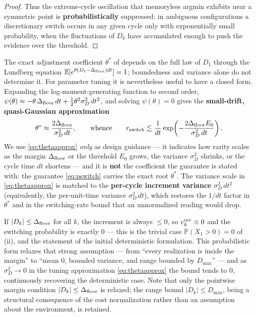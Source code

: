 \begin{proof}
Thus the extreme-cycle oscillation that memoryless argmin exhibits near a symmetric point is \textbf{probabilistically} suppressed: in ambiguous configurations a discretionary switch occurs in any given cycle only with exponentially small probability, when the fluctuations of $D_k$ have accumulated enough to push the evidence over the threshold.
\end{proof}

\begin{remark} \label{rem:tuning}
The exact adjustment coefficient $\theta^*$ of  depends on the full law of $D_1$ through the Lundberg equation $\mathbb{E}[e^{\theta (D_1-\Delta_{\text{floor}})dt}] = 1$; boundedness and variance alone do not determine it. For parameter tuning it is nevertheless useful to have a closed form. Expanding the log-moment-generating function to second order, $\psi(\theta) \approx -\theta\,\Delta_{\text{floor}}\,dt + \tfrac{1}{2}\theta^2 \sigma_D^2\, dt^2$, and solving $\psi(\theta) = 0$ gives the \textbf{small-drift, quasi-Gaussian approximation}
\begin{equation}
\theta^* \approx \frac{2\Delta_{\text{floor}}}{\sigma_D^2\, dt},
\qquad\text{whence}\qquad
r_{\text{switch}} \lesssim \frac{1}{dt} \exp\!\left(-\frac{2\Delta_{\text{floor}} E_0}{\sigma_D^2\, dt}\right).
\label{eq:thetaapprox}
\end{equation}
We use \eqref{eq:thetaapprox} \emph{only} as design guidance --- it indicates how rarity scales as the margin $\Delta_{\text{floor}}$ or the threshold $E_0$ grows, the variance $\sigma_D^2$ shrinks, or the cycle time $dt$ shortens --- and it is \textbf{not} the coefficient the guarantee is stated with: the guarantee \eqref{eq:pswitch} carries the exact root $\theta^*$. The variance scale in \eqref{eq:thetaapprox} is matched to the \textbf{per-cycle increment variance $\sigma_D^2\,dt^2$} (equivalently, the per-unit-time variance $\sigma_D^2\,dt$), which restores the $1/dt$ factor in $\theta^*$ and in the switching-rate bound that an unnormalized reading would drop.
\end{remark}

\begin{remark}
If $|D_k| \le \Delta_{\text{floor}}$ for all $k$, the increment is always $\le 0$, so $e^{\text{rev}}_k \equiv 0$ and the switching probability is exactly 0 --- this is the trivial case $\mathbb{P}(X_1 > 0) = 0$ of (ii), and the statement of the initial deterministic formulation. This probabilistic form relaxes that strong assumption --- from ``every realization is inside the margin'' to ``mean 0, bounded variance, and range bounded by $D_{\max}$'' --- and as $\sigma_D^2 \to 0$ in the tuning approximation \eqref{eq:thetaapprox} the bound tends to 0, continuously recovering the deterministic case. Note that only the pointwise margin condition $|D_k| \le \Delta_{\text{floor}}$ is relaxed; the range bound $|D_k| \le D_{\max}$, being a structural consequence of the cost normalization rather than an assumption about the environment, is retained.
\end{remark}

